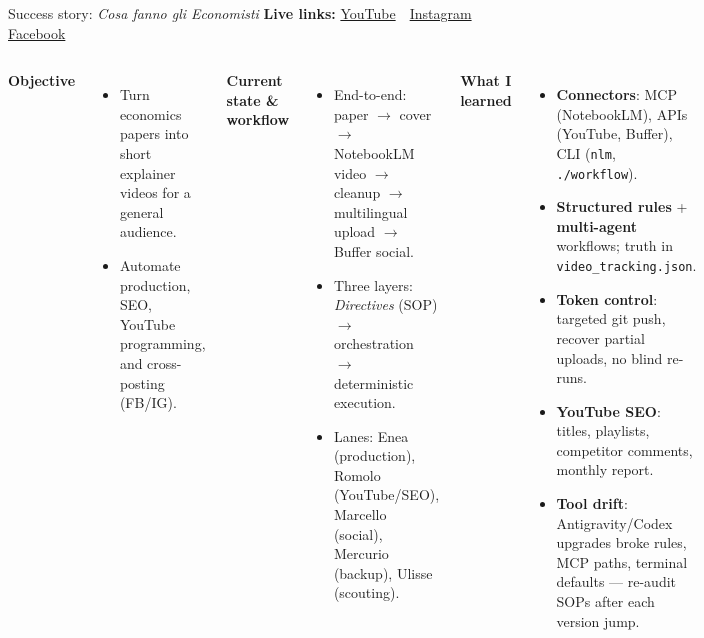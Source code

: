 
\begin{frame}{Success story: \emph{Cosa fanno gli Economisti}}
  \footnotesize
  \textbf{Live links:}
  \href{https://www.youtube.com/@cosafannoglieconomisti26}{YouTube}
  \,\textbar\,
  \href{https://www.instagram.com/cosafannoglieconomisti}{Instagram}
  \,\textbar\,
  \href{https://www.facebook.com/cosafannoglieconomisti}{Facebook}
  \vspace{0.15cm}
  \begin{columns}[T,onlytextwidth]
      \textbf{Objective}
      \begin{itemize}\setlength\itemsep{0.2em}
        \item Turn economics papers into short explainer videos for a general audience.
        \item Automate production, SEO, YouTube programming, and cross-posting (FB/IG).
      \end{itemize}
      \vspace{0.15cm}
      \textbf{Current state \& workflow}
      \begin{itemize}\setlength\itemsep{0.2em}
        \item End-to-end: paper $\rightarrow$ cover $\rightarrow$ NotebookLM video $\rightarrow$ cleanup $\rightarrow$ multilingual upload $\rightarrow$ Buffer social.
        \item Three layers: \emph{Directives} (SOP) $\rightarrow$ orchestration $\rightarrow$ deterministic execution.
        \item Lanes: Enea (production), Romolo (YouTube/SEO), Marcello (social), Mercurio (backup), Ulisse (scouting).
      \end{itemize}
      \textbf{What I learned}
      \begin{itemize}\setlength\itemsep{0.2em}
        \item \textbf{Connectors}: MCP (NotebookLM), APIs (YouTube, Buffer), CLI (\texttt{nlm}, \texttt{./workflow}).
        \item \textbf{Structured rules} + \textbf{multi-agent} workflows; truth in \texttt{video\_tracking.json}.
        \item \textbf{Token control}: targeted git push, recover partial uploads, no blind re-runs.
        \item \textbf{YouTube SEO}: titles, playlists, competitor comments, monthly report.
        \item \textbf{Tool drift}: Antigravity/Codex upgrades broke rules, MCP paths, terminal defaults --- re-audit SOPs after each version jump.
      \end{itemize}
    
  \end{columns}
\end{frame}

